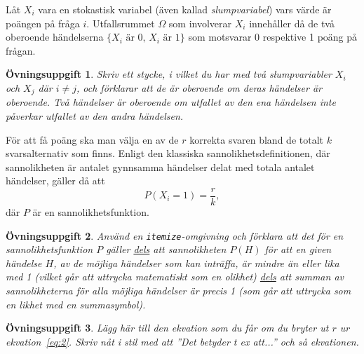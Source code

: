 \documentclass[12pt,a4wide]{article}
\theoremstyle{uppgiftsstil}
\newcommand{\ovningstext}{Övningsuppgift}
\newtheorem{ovning}{\ovningstext}
\newenvironment{uppgift}{\begin{framed}\begin{ovning}}%
                        {\end{ovning}\end{framed}}
\theoremstyle{avklaradstil}
\begin{document}
Låt $X_i$    %
vara en stokastisk variabel (även kallad \emph{slumpvariabel}) vars
värde är poängen på fråga $i$. Utfallsrummet $\Omega$  
som involverar $X_i$ innehåller då de två oberoende händelserna
$\{\text{$X_i$ är 0, $X_i$ är 1}\}$ 
som motsvarar 0 respektive 1 poäng på frågan.

\begin{uppgift}
  Skriv ett stycke, i vilket du har med två slumpvariabler $X_i$ och
  $X_j$ där $i \not= j$, och förklarar att de är oberoende om deras
  händelser är oberoende. Två händelser är oberoende om  utfallet av
  den ena händelsen inte påverkar utfallet av den andra händelsen.  
\end{uppgift}

För att få poäng ska man välja en av de $r$ korrekta svaren bland de
totalt $k$ svarsalternativ som finns. Enligt den klassiska
sannolikhetsdefinitionen, där sannolikheten är antalet gynnsamma
händelser delat med totala antalet händelser, gäller då att 
\begin{equation}           %
  \label{eq:2}             %
  P(X_i=1) = \frac{r}{k},  %
\end{equation}             %
där $P$ är en sannolikhetsfunktion. 

\begin{uppgift}
  Använd en \texttt{itemize}-omgivning och förklara att det för en
  sannolikhetsfunktion $P$ gäller \underline{dels} att sannolikheten
  $P(H)$ för att en given händelse $H$, av de möjliga händelser som
  kan inträffa, är mindre än eller lika med 1 (vilket går att
  uttrycka matematiskt som en olikhet) \underline{dels} att summan av
  sannolikheterna för alla möjliga händelser är precis 1 (som går att
  uttrycka som en likhet med en summasymbol). 
\end{uppgift}

\begin{uppgift}
  Lägg här till den ekvation som du får om du bryter ut $r$ ur
  ekvation~\ref{eq:2}. Skriv nåt i stil med att ''Det betyder t ex
  att...'' och så ekvationen. 
\end{uppgift} 
\end{document}
